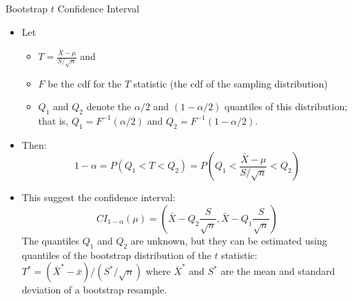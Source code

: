 \documentclass[
  ignorenonframetext,
]{beamer}
\providecommand{\tightlist}{%
  \setlength{\itemsep}{0pt}\setlength{\parskip}{0pt}}
\begin{document}
\begin{frame}{Bootstrap \(t\) Confidence Interval}
\label{bootstrap-t-confidence-interval-9}
\begin{itemize}
\item
  Let

  \begin{itemize}
  \tightlist
  \item
    \(T=\frac{\bar{X}-\mu}{S/\sqrt{n}}\) and
  \item
    \(F\) be the cdf for the \(T\) statistic (the cdf of the sampling
    distribution)
  \item
    \(Q_1\) and \(Q_2\) denote the \(\alpha/2\) and \((1-\alpha/2)\)
    quantiles of this distribution; that is, \(Q_1=F^{-1}(\alpha/2)\)
    and \(Q_2=F^{-1}(1-\alpha/2)\).
  \end{itemize}
\item
  Then:
  \[1-\alpha=P(Q_1<T<Q_2)=P\left(Q_1<\frac{\bar{X}-\mu}{S/\sqrt{n}}<Q_2\right)\]
\item
  This suggest the confidence interval:
  \[CI_{1-\alpha}(\mu)=\left(\bar{X}-Q_2\frac{S}{\sqrt{n}},\bar{X}-Q_1\frac{S}{\sqrt{n}}\right)\]
  \tiny The quantiles \(Q_1\) and \(Q_2\) are unknown, but they can be
  estimated using quantiles of the bootstrap distribution of the \(t\)
  statistic: \(T^*=(\bar{X}^*-\bar{x})/(S^*/\sqrt{n})\) where
  \(\bar{X}^*\) and \(S^*\) are the mean and standard deviation of a
  bootstrap resample. \normalsize
\end{itemize}
\end{frame}
\end{document}
